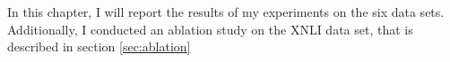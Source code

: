 \label{chap:5_results}

In this chapter, I will report the results of my experiments on the six data sets. Additionally, I
conducted an ablation study on the XNLI data set, that is described in section \ref{sec:ablation}














